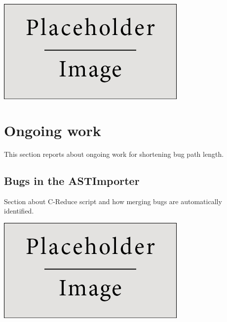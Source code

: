 \documentclass[a0,portrait]{a0poster}
\begin{document}
\begin{multicols}{2}
\begin{center}\vspace{1cm}
\includegraphics[width=0.8\linewidth]{placeholder}
\end{center}\vspace{1cm}


\section*{Ongoing work}

This section reports about ongoing work for shortening bug path length. 


\subsection*{Bugs in the ASTImporter}

Section about C-Reduce script and how merging bugs are automatically identified.
\begin{center}\vspace{1cm}
\includegraphics[width=0.8\linewidth]{placeholder}
\end{center}\vspace{1cm}



\end{multicols}
\end{document}
